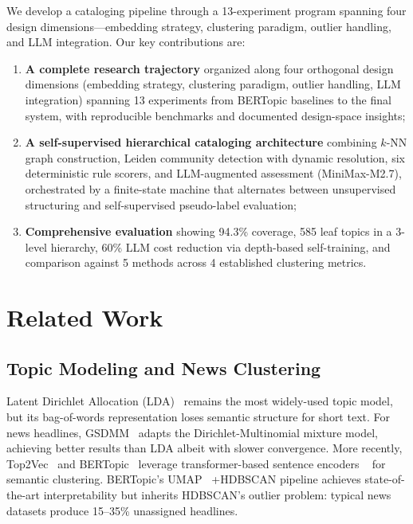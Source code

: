 \documentclass[10pt,twocolumn,twoside]{article}
\begin{document}
We develop a cataloging pipeline through a 13-experiment program spanning four design 
dimensions---embedding strategy, clustering paradigm, outlier handling, and LLM integration. 
Our key contributions are:

\begin{enumerate}
    \item \textbf{A complete research trajectory} organized along four orthogonal design 
    dimensions (embedding strategy, clustering paradigm, outlier handling, LLM integration) 
    spanning 13 experiments from BERTopic baselines to the final system, with reproducible 
    benchmarks and documented design-space insights;
    \item \textbf{A self-supervised hierarchical cataloging architecture} combining $k$-NN graph 
    construction, Leiden community detection with dynamic resolution, six deterministic rule 
    scorers, and LLM-augmented assessment (MiniMax-M2.7), orchestrated by a finite-state 
    machine that alternates between unsupervised structuring and self-supervised pseudo-label 
    evaluation;
    \item \textbf{Comprehensive evaluation} showing 94.3\% coverage, 585 leaf topics in a 
    3-level hierarchy, 60\% LLM cost reduction via depth-based self-training, and
    comparison against 5 methods across 4 established clustering metrics.
\end{enumerate}

\section{Related Work}

\subsection{Topic Modeling and News Clustering}
Latent Dirichlet Allocation (LDA)~\citep{blei2003latent} remains the most widely-used topic 
model, but its bag-of-words representation loses semantic structure for short text. For news 
headlines, GSDMM~\citep{yin2014gsdmm} adapts the Dirichlet-Multinomial mixture model, achieving 
better results than LDA albeit with slower convergence. More recently, Top2Vec~\citep{angelov2020} 
and BERTopic~\citep{grootendorst2022bertopic} leverage transformer-based sentence encoders 
~\citep{reimers2019sentence} for semantic clustering. BERTopic's UMAP~\citep{mcinnes2018umap} 
+HDBSCAN pipeline achieves state-of-the-art interpretability but inherits HDBSCAN's outlier 
problem: typical news datasets produce 15--35\% unassigned headlines.
\end{document}
